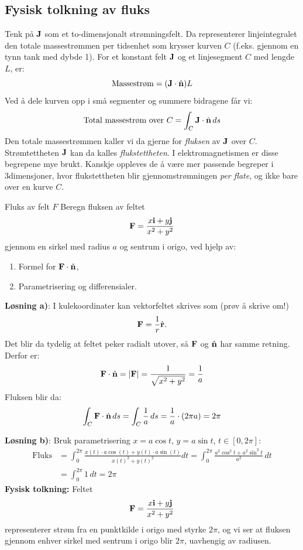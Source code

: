 \subsection*{Fysisk tolkning av fluks}
Tenk på $\mathbf{J}$ som et to-dimensjonalt strømningsfelt. Da representerer linjeintegralet den totale massestrømmen per tidsenhet som krysser kurven $C$ (f.eks. gjennom en tynn tank med dybde 1).
For et konstant felt $\mathbf{J}$ og et linjesegment $C$ med lengde $L$, er:
\[
\text{Massestrøm} = (\mathbf{J} \cdot \hat{\mathbf{n}})L
\]
Ved å dele kurven opp i små segmenter og summere bidragene får vi:
\[
\text{Total massestrøm over } C = \int_C \mathbf{J} \cdot \hat{\mathbf{n}} \, ds
\]
Den totale massestrømmen kaller vi da gjerne for \textit{fluksen} av $\mathbf{J}$ over $\textit{C}$. Strømtettheten $\mathbf{J}$ kan da kalles \textit{flukstettheten}. I elektromagnetismen er disse begrepene mye brukt. Kanskje oppleves de å være mer passende begreper i 3dimensjoner, hvor flukstettheten blir gjennomstrømningen \textit{per flate}, og ikke bare over en kurve $\textit{C}$.

\begin{eks}{Fluks av felt $F$}
Beregn fluksen av feltet 
\[
\mathbf{F} = \frac{x\mathbf{i} + y\mathbf{j}}{x^2 + y^2}
\]
gjennom en sirkel med radius $a$ og sentrum i origo, ved hjelp av:
\begin{enumerate}
\item Formel for $\mathbf{F} \cdot \hat{\mathbf{n}}$,
\item Parametrisering og differensialer.
\end{enumerate}

\textbf{Løsning a)}: I kulekoordinater kan vektorfeltet skrives som (prøv å skrive om!)
\[\mathbf{F}=\frac{1}{r}\hat{\mathbf{r}}.\]
Det blir da tydelig at feltet peker radialt utover, så $\mathbf{F}$ og $\hat{\mathbf{n}}$ har samme retning. Derfor er:
\[
\mathbf{F} \cdot \hat{\mathbf{n}} = |\mathbf{F}| = \frac{1}{\sqrt{x^2 + y^2}} = \frac{1}{a}
\]
Fluksen blir da:
\[
\int_C \mathbf{F} \cdot\hat{\mathbf{n}} \, ds = \int_C \frac{1}{a} \, ds = \frac{1}{a} \cdot (2\pi a) = 2\pi
\]

\textbf{Løsning b)}: Bruk parametrisering $x = a \cos t$, $y = a \sin t$, $t \in [0, 2\pi]$:
\begin{align*}
\text{Fluks} &= \int_0^{2\pi} \frac{x(t)\cdot a \cos(t) + y(t)\cdot a \sin(t) }{x(t)^2 + y(t)^2}  dt = \int_0^{2\pi} \frac{a^2 \cos^2 t + a^2 \sin^2 t}{a^2} \, dt \\ &= \int_0^{2\pi} 1 \, dt = 2\pi
\end{align*}
\textbf{Fysisk tolkning:}
Feltet 
\[
\mathbf{F} = \frac{x\mathbf{i} + y\mathbf{j}}{x^2 + y^2}
\]
representerer strøm fra en punktkilde i origo med styrke $2\pi$, og vi ser at fluksen gjennom enhver sirkel med sentrum i origo blir $2\pi$, uavhengig av radiusen.
\end{eks}



